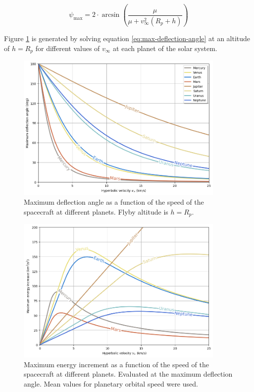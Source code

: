 \begin{equation}
  \psi_{\max} = 2 \cdot \arcsin{\left(\frac{\mu}{\mu + {v}^{2}_{\infty}(R_p + h)}\right)}
  \label{eq:max-deflection-angle}
\end{equation}

Figure \ref{fig:deflection-angle-at-speed} is generated by solving equation
\ref{eq:max-deflection-angle} at an altitude of $h = R_p$ for different values
of $v_{\infty}$ at each planet of the solar system.

\begin{figure}[H]
  \centering
  \includegraphics[width=0.9\textwidth]{fig/static/deflection_angle.png}
  \caption[Maximum deflection angle as a function of the speed of the spacecraft
        at different planets.]{Maximum deflection angle as a function of the
        speed of the spacecraft at different planets. Flyby altitude is
        $h = R_p$.}
  \label{fig:deflection-angle-at-speed}
\end{figure}

\begin{figure}[H]
  \centering
  \includegraphics[width=0.9\textwidth]{fig/static/max_energy.png}
  \caption[Maximum energy increment as a function of the speed of the
    spacecraft at different planets.]{Maximum energy increment as a function
    of the speed of the spacecraft at different planets. Evaluated at the
        maximum deflection angle. Mean values for planetary orbital speed were used.}
  \label{fig:max-energy-at-speed}
\end{figure}

